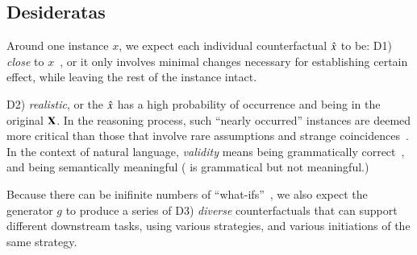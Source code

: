 \subsection{Desideratas}
Around one instance $x$, we expect each individual counterfactual $\hat{x}$ to be: 
D1) \emph{close} to $x$~\cite{pearl2018causal}, or it only involves minimal changes necessary for establishing certain effect, while leaving the rest of the instance intact.

D2) \emph{realistic}, or the $\hat{x}$ has a high probability of occurrence and being in the original $\mathbf{X}$.
In the reasoning process, such ``nearly occurred'' instances are deemed more critical than those that involve rare assumptions and strange coincidences~\cite{kahneman}.
In the context of natural language, \emph{validity} means being grammatically correct~\cite{morris2020textattack}, and being semantically meaningful (\eg {} is grammatical but not meaningful.) 

Because there can be inifinite numbers of ``what-ifs''~\cite{pearl2018causal, kahneman}, we also expect the generator $g$ to produce a series of D3) \emph{diverse} counterfactuals that can support different downstream tasks, using various strategies, and various initiations of the same strategy.




